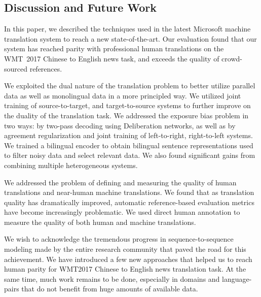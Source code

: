 \documentclass[a4paper]{article}
\begin{document}
\begin{CJK*}{UTF8}{gbsn}
\section{Discussion and Future Work}

In this paper, we described the techniques used in the latest Microsoft machine translation system to reach a new state-of-the-art. Our evaluation found that our system has reached parity with professional human translations on the WMT~2017 Chinese to English news task, and exceeds the quality of crowd-sourced references. 

We exploited the dual nature of the translation problem to better utilize parallel data as well as monolingual data in a more principled way. We utilized  joint training of source-to-target, and target-to-source systems to further improve on the duality of the translation task. We addressed the exposure bias problem in two ways: by two-pass decoding using Deliberation networks, as well as by agreement regularization and joint training of left-to-right, right-to-left systems. We trained a bilingual encoder to obtain bilingual sentence representations used to filter noisy data and select relevant data. We also found significant gains from combining multiple heterogeneous systems. 

We addressed the problem of defining and measuring the quality of human translations and near-human machine translations. We found that as translation quality has dramatically improved, automatic reference-based evaluation metrics have become increasingly problematic. We used direct human annotation to measure the quality of both human and machine translations.

We wish to acknowledge the tremendous progress in sequence-to-sequence modeling made by the entire research community that paved the road for this achievement. We have introduced a few new approaches that helped us to reach human parity for WMT2017 Chinese to English news translation task. At the same time, much work remains to be done, especially in domains and language-pairs that do not benefit from huge amounts of available data. 


\vfill




\end{CJK*}
\end{document}
